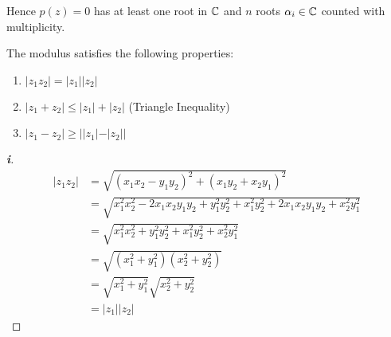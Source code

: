 \documentclass[../main.tex]{subfiles}
\begin{document}
Hence $p(z) = 0$ has at least one root in $\mathbb{C}$ and $n$ roots $\alpha_i \in \mathbb{C}$ counted with multiplicity.
\begin{proposition}
  The modulus satisfies the following properties:
  \begin{enumerate}
    \item $|z_1 z_2| = |z_1||z_2|$
    \item $|z_1 + z_2| \leq |z_1| + |z_2|$ (Triangle Inequality)
    \item $|z_1 - z_2| \geq ||z_1| - |z_2||$
  \end{enumerate}
\end{proposition}
\begin{proof}[\textbf{i}]
  \begin{align*}
      |z_1 z_2| &= \sqrt{(x_1 x_2 - y_1 y_2)^2 + (x_1 y_2 + x_2 y_1)^2}\\
                &= \sqrt{x^{2}_{1} x^{2}_{2} -2x_1x_2y_1y_2 + y^{2}_{1}y^{2}_{2} + x^{2}_{1}y^{2}_{2} + 2x_1x_2y_1y_2 + x^{2}_{2}y^{2}_{1}} \\
                &= \sqrt{x^{2}_{1} x^{2}_{2} + y^{2}_{1} y^{2}_{2} + x^{2}_{1} y^{2}_{2} + x^{2}_{2} y^{2}_{1}} \\
                &= \sqrt{\left(x^{2}_{1} + y^{2}_{1}\right)\left(x^{2}_{2} + y^{2}_{2}\right)} \\
                &= \sqrt{x^{2}_{1} + y^{2}_{1}}\sqrt{x^{2}_{2} + y^{2}_{2}} \\
                &= |z_1||z_2|
  \end{align*}
\end{proof}
\end{document}
